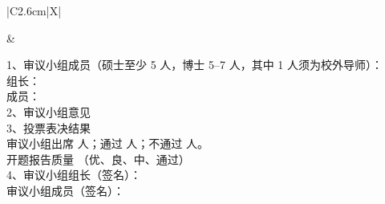 \documentclass[UTF8,a4paper,zihao=-4]{ctexart}
\renewcommand{\arraystretch}{1.35}
\newcommand{\emptyline}[1][4.5cm]{\underline{\makebox[#1]{}}}
\newcommand{\vlabel}[2]{%
\begin{minipage}[c][#1][c]{\linewidth}
\centering #2
\end{minipage}%
}
\begin{document}
\newpage
\vspace*{-1.0cm}

\begingroup
    \renewcommand{\arraystretch}{0.95}
    
    \noindent
    \begin{tabularx}{\textwidth}{|C{2.6cm}|X|}
        \hline
        
        \vlabel{12.6cm}{}
        &
        \begin{minipage}[c][12.6cm][t]{0.96\linewidth}
            \vspace{1em}
            
            1、审议小组成员（硕士至少 5 人，博士 5--7 人，其中 1 人须为校外导师）：\\[0.25em]
            
            \hspace{1.5em}组长：\emptyline[4cm]\\[0.25em]
            
            \hspace{1.5em}成员：\emptyline[4cm]\\[0.25em]
            
            2、审议小组意见\\[1.6em]
            
            3、投票表决结果\\[0.25em]
            
            \hspace{1.5em}审议小组出席 \emptyline[1.4cm] 人；通过 \emptyline[1.4cm] 人；不通过 \emptyline[1.4cm] 人。\\[0.25em]
            
            \hspace{1em}开题报告质量 \emptyline[4cm] （优、良、中、通过）\\[0.25em]
            
            4、审议小组组长（签名）：\emptyline[4cm]\\[0.25em]
            
            \hspace{1.5em}审议小组成员（签名）：\emptyline[4cm]\\[0.25em]
            

\end{minipage}
\end{tabularx}
\end{document}
